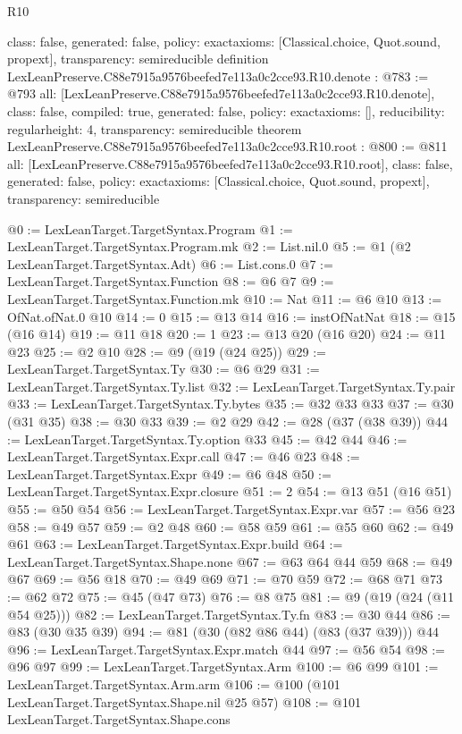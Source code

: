 \begin{lexlean}{R10}
\begin{coremodule}
{  class: false,
  generated: false,
  policy: exact{axioms: [Classical.choice, Quot.sound, propext]},
  transparency: semireducible
}
definition LexLeanPreserve.C88e7915a9576beefed7e113a0c2cce93.R10.denote : @783 := @793 {
  all: [LexLeanPreserve.C88e7915a9576beefed7e113a0c2cce93.R10.denote],
  class: false,
  compiled: true,
  generated: false,
  policy: exact{axioms: []},
  reducibility: regular{height: 4},
  transparency: semireducible
}
theorem LexLeanPreserve.C88e7915a9576beefed7e113a0c2cce93.R10.root : @800 := @811 {
  all: [LexLeanPreserve.C88e7915a9576beefed7e113a0c2cce93.R10.root],
  class: false,
  generated: false,
  policy: exact{axioms: [Classical.choice, Quot.sound, propext]},
  transparency: semireducible
}

@0 := LexLeanTarget.TargetSyntax.Program
@1 := LexLeanTarget.TargetSyntax.Program.mk
@2 := List.nil.{0}
@5 := @1 (@2 LexLeanTarget.TargetSyntax.Adt)
@6 := List.cons.{0}
@7 := LexLeanTarget.TargetSyntax.Function
@8 := @6 @7
@9 := LexLeanTarget.TargetSyntax.Function.mk
@10 := Nat
@11 := @6 @10
@13 := OfNat.ofNat.{0} @10
@14 := 0
@15 := @13 @14
@16 := instOfNatNat
@18 := @15 (@16 @14)
@19 := @11 @18
@20 := 1
@23 := @13 @20 (@16 @20)
@24 := @11 @23
@25 := @2 @10
@28 := @9 (@19 (@24 @25))
@29 := LexLeanTarget.TargetSyntax.Ty
@30 := @6 @29
@31 := LexLeanTarget.TargetSyntax.Ty.list
@32 := LexLeanTarget.TargetSyntax.Ty.pair
@33 := LexLeanTarget.TargetSyntax.Ty.bytes
@35 := @32 @33 @33
@37 := @30 (@31 @35)
@38 := @30 @33
@39 := @2 @29
@42 := @28 (@37 (@38 @39))
@44 := LexLeanTarget.TargetSyntax.Ty.option @33
@45 := @42 @44
@46 := LexLeanTarget.TargetSyntax.Expr.call
@47 := @46 @23
@48 := LexLeanTarget.TargetSyntax.Expr
@49 := @6 @48
@50 := LexLeanTarget.TargetSyntax.Expr.closure
@51 := 2
@54 := @13 @51 (@16 @51)
@55 := @50 @54
@56 := LexLeanTarget.TargetSyntax.Expr.var
@57 := @56 @23
@58 := @49 @57
@59 := @2 @48
@60 := @58 @59
@61 := @55 @60
@62 := @49 @61
@63 := LexLeanTarget.TargetSyntax.Expr.build
@64 := LexLeanTarget.TargetSyntax.Shape.none
@67 := @63 @64 @44 @59
@68 := @49 @67
@69 := @56 @18
@70 := @49 @69
@71 := @70 @59
@72 := @68 @71
@73 := @62 @72
@75 := @45 (@47 @73)
@76 := @8 @75
@81 := @9 (@19 (@24 (@11 @54 @25)))
@82 := LexLeanTarget.TargetSyntax.Ty.fn
@83 := @30 @44
@86 := @83 (@30 @35 @39)
@94 := @81 (@30 (@82 @86 @44) (@83 (@37 @39))) @44
@96 := LexLeanTarget.TargetSyntax.Expr.match @44
@97 := @56 @54
@98 := @96 @97
@99 := LexLeanTarget.TargetSyntax.Arm
@100 := @6 @99
@101 := LexLeanTarget.TargetSyntax.Arm.arm
@106 := @100 (@101 LexLeanTarget.TargetSyntax.Shape.nil @25 @57)
@108 := @101 LexLeanTarget.TargetSyntax.Shape.cons

\end{coremodule}
\end{lexlean}
